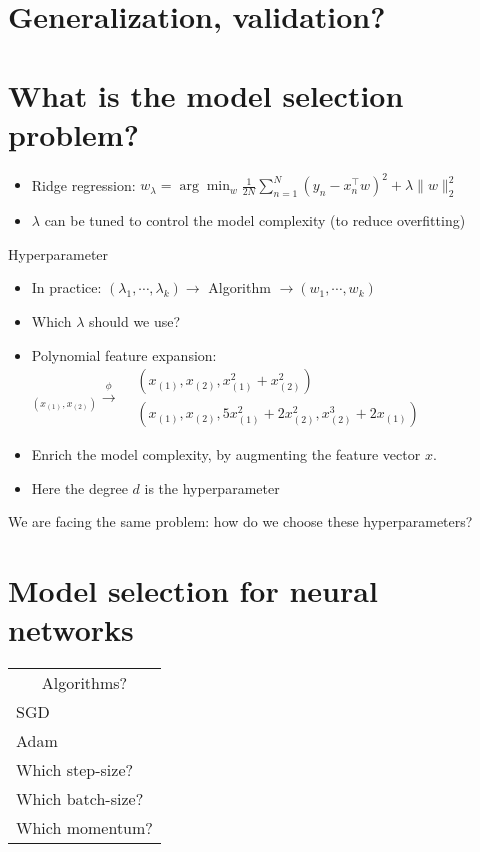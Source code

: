 \section*{Generalization, validation?}

\section*{What is the model selection problem?}
\begin{itemize}
  \item Ridge regression: $w_{\lambda}=\arg \min _{w} \frac{1}{2 N} \sum_{n=1}^{N}\left(y_{n}-x_{n}^{\top} w\right)^{2}+\lambda\|w\|_{2}^{2}$
  \item $\lambda$ can be tuned to control the model complexity (to reduce overfitting)
\end{itemize}

Hyperparameter

\begin{itemize}
  \item In practice: $\left(\lambda_{1}, \cdots, \lambda_{k}\right) \longrightarrow$ Algorithm $\longrightarrow\left(w_{1}, \cdots, w_{k}\right)$

  \item Which $\lambda$ should we use?

  \item Polynomial feature expansion: ${ }_{\left(x_{(1)}, x_{(2)}\right)} \xrightarrow{\phi} \begin{aligned} & \left(x_{(1)}, x_{(2)}, x_{(1)}^{2}+x_{(2)}^{2}\right) \\ & \left(x_{(1)}, x_{(2)}, 5 x_{(1)}^{2}+2 x_{(2)}^{2}, x_{(2)}^{3}+2 x_{(1)}\right)\end{aligned}$

  \item Enrich the model complexity, by augmenting the feature vector $x$.

  \item Here the degree $d$ is the hyperparameter

\end{itemize}

We are facing the same problem: how do we choose these hyperparameters?

\section*{Model selection for neural networks}
\begin{center}
\begin{tabular}{|l|}
\hline
\multicolumn{1}{|c|}{Algorithms?} \\
SGD \\
Adam \\
Which step-size? \\
Which batch-size? \\
Which momentum? \\
\hline
\end{tabular}
\end{center}

